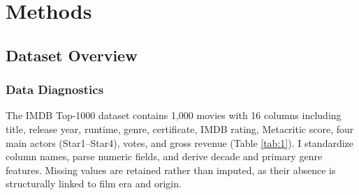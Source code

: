\documentclass{article}  %
\begin{document}
\section{Methods}

\subsection{Dataset Overview}

\subsubsection{Data Diagnostics}

The IMDB Top-1000 dataset contains 1,000 movies with 16 columns including title, release year, runtime, genre, certificate, IMDB rating, Metacritic score, four main actors (Star1–Star4), votes, and gross revenue (Table \ref{tab:1}). I standardize column names, parse numeric fields, and derive decade and primary genre features. Missing values are retained rather than imputed, as their absence is structurally linked to film era and origin. 
\end{document}
